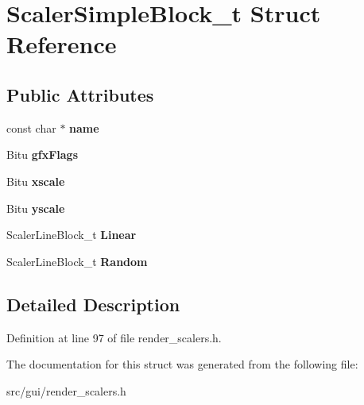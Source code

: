 \hypertarget{structScalerSimpleBlock__t}{\section{Scaler\-Simple\-Block\-\_\-t Struct Reference}
\label{structScalerSimpleBlock__t}
}
\subsection*{Public Attributes}
\begin{DoxyCompactItemize}
\item 
\hypertarget{structScalerSimpleBlock__t_a0fdaf375ec143cae7f7b11465ae975ff}{const char $\ast$ {\bfseries name}}\label{structScalerSimpleBlock__t_a0fdaf375ec143cae7f7b11465ae975ff}

\item 
\hypertarget{structScalerSimpleBlock__t_a30bee53c824a6dd88f08b62d88937db3}{Bitu {\bfseries gfx\-Flags}}\label{structScalerSimpleBlock__t_a30bee53c824a6dd88f08b62d88937db3}

\item 
\hypertarget{structScalerSimpleBlock__t_a67eb762fbf4729bc36309adfc1fd3cee}{Bitu {\bfseries xscale}}\label{structScalerSimpleBlock__t_a67eb762fbf4729bc36309adfc1fd3cee}

\item 
\hypertarget{structScalerSimpleBlock__t_a49bc7ebaf5253a00b3c2d457d4eebb4a}{Bitu {\bfseries yscale}}\label{structScalerSimpleBlock__t_a49bc7ebaf5253a00b3c2d457d4eebb4a}

\item 
\hypertarget{structScalerSimpleBlock__t_a0a19750c23eb47b47e7ce6fad76878e2}{Scaler\-Line\-Block\-\_\-t {\bfseries Linear}}\label{structScalerSimpleBlock__t_a0a19750c23eb47b47e7ce6fad76878e2}

\item 
\hypertarget{structScalerSimpleBlock__t_a94844f24c473599f6628b2cc10cdd38b}{Scaler\-Line\-Block\-\_\-t {\bfseries Random}}\label{structScalerSimpleBlock__t_a94844f24c473599f6628b2cc10cdd38b}

\end{DoxyCompactItemize}


\subsection{Detailed Description}


Definition at line 97 of file render\-\_\-scalers.\-h.



The documentation for this struct was generated from the following file\-:\begin{DoxyCompactItemize}
\item 
src/gui/render\-\_\-scalers.\-h\end{DoxyCompactItemize}
